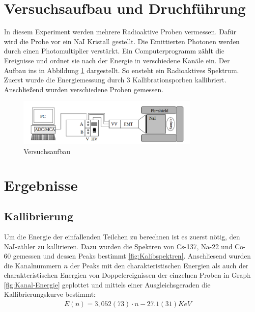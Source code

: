 \documentclass[11pt, a4paper]{article}
\begin{document}
    \section{Versuchsaufbau und Druchführung}

    In diesem Experiment werden mehrere Radioaktive Proben vermessen. Dafür wird die Probe vor ein NaI Kristall gestellt. Die Emittierten Photonen werden durch einen Photomultiplier verstärkt. Ein Computerprogramm zählt die Ereignisse und ordnet sie nach der Energie in verschiedene Kanäle ein. Der Aufbau ins in Abbildung \ref{fig:aufbau} dargestellt. So ensteht ein Radioaktives Spektrum. Zuerst wurde die Energiemessung durch 3 Kallibrationsporben kallibriert. Anschließend wurden verschiedene Proben gemessen.
    
    \begin{figure}
        \centering
        \includegraphics[width=0.8\textwidth]{Screenshot 2023-03-14 5.37.15 PM.png}
        \caption{Versuchsaufbau}
        \label{fig:aufbau}
    \end{figure}

    \section{Ergebnisse}
    \FloatBarrier
    \subsection{Kallibrierung}
    Um die Energie der einfallenden Teilchen zu berechnen ist es zuerst nötig, den NaI-zähler zu kallirieren. Dazu wurden die Spektren von Cs-137, Na-22 und Co-60 gemessen und dessen Peaks bestimmt \ref{fig:Kalibspektren}. 
    Anschliesend wurden die Kanalnummern $n$ der Peaks mit den charakteristischen Energien als auch der charakteristischen Energien von Doppelereignissen der einzelnen Proben in Graph \ref{fig:Kanal-Energie} geplottet und mittels einer Ausgleichsgeraden die Kallibrierungskurve bestimmt:
    \begin{align}
        E(n) = 3,052(73) \cdot n - 27.1(31) KeV
    \end{align}
    
\end{document}
